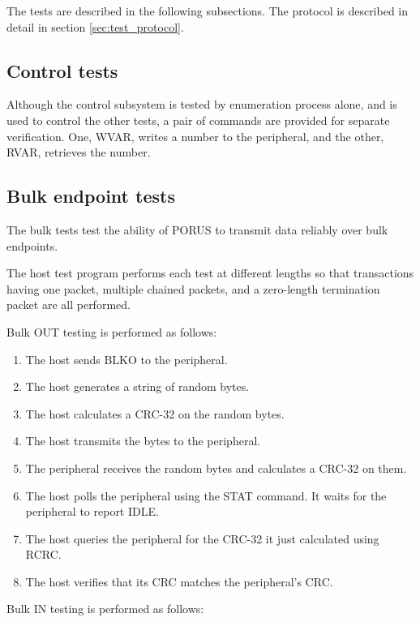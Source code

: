 \documentclass[a4paper]{book}
\begin{document}
The tests are described in the following subsections.  The protocol is described in detail in section \ref{sec:test_protocol}.

\subsection{Control tests}

Although the control subsystem is tested by enumeration process alone, and is used to control the other tests, a pair of commands are provided for separate verification.  One, WVAR, writes a number to the peripheral, and the other, RVAR, retrieves the number.

\subsection{Bulk endpoint tests}
\label{sec_bulktest}

The bulk tests test the ability of PORUS to transmit data reliably over bulk endpoints.

The host test program performs each test at different lengths so that transactions having one packet, multiple chained packets, and a zero-length termination packet are all performed.

Bulk OUT testing is performed as follows:

\begin{enumerate}
\item The host sends BLKO to the peripheral.
\item The host generates a string of random bytes.
\item The host calculates a CRC-32 on the random bytes.
\item The host transmits the bytes to the peripheral.
\item The peripheral receives the random bytes and calculates a CRC-32 on them.
\item The host polls the peripheral using the STAT command.  It waits for the peripheral to report IDLE.
\item The host queries the peripheral for the CRC-32 it just calculated using RCRC.
\item The host verifies that its CRC matches the peripheral's CRC.
\end{enumerate}

Bulk IN testing is performed as follows:
\end{document}
